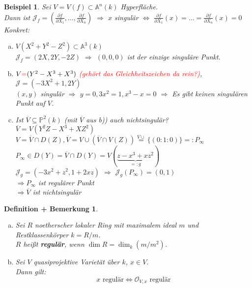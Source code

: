\documentclass[a4paper,12pt]{report}
\theoremstyle{break}
\newtheorem{DefBem}[Def]{Definition + Bemerkung}
\theoremstyle{nonumberbreak}
\newtheorem{nnBsp}{Beispiel}
\theoremstyle{nonumberplain}
\newcommand{\emp}[1]{\textbf{\emph{#1}}}
\newcommand{\begriff}[1]{{\index{#1}}\emp{#1}}
\newcommand{\A}{\mathbb{A}}
\newcommand{\IP}{\mathbb{P}}%
\newcommand{\calO}{\mathcal{O}}
\newcommand{\calJ}{\mathcal{J}}
\begin{document}
\begin{nnBsp}
Sei $V=V(f)\subset\A^n(k)$ Hyperfl\"ache.\\
Dann ist $\calJ_f=\left( \frac{\partial f}{\partial X_1},\ldots ,\frac{\partial f}{\partial X_n} \right)$ $\Longrightarrow$ $x$ singul\"ar $\Leftrightarrow$ $\frac{\partial f}{\partial X_1}(x)=\ldots =\frac{\partial f}{\partial X_n}(x)=0$\\
\emph{Konkret:}\begin{enumerate}[a)]
\item
	$V(X^2+Y^2-Z^2)\subset\A^3(k)$\\
	$\calJ_f=(2X,2Y,-2Z)$ $\Rightarrow $ $(0,0,0)$ ist der einzige singul\"are Punkt.
\item
	$V\textcolor{red}{=}(Y^2-X^3+X^3)$ \textcolor{red}{(geh\"ort das Gleichheitszeichen da rein?)}, $\calJ=(-3X^2+1,2Y)$\\
	$(x,y)$ singul\"ar $\Rightarrow$ $y=0, 3x^2=1, x^3-x=0$ $\Rightarrow $ Es gibt keinen singul\"aren Punkt auf $V$.
\item
	Ist $\overline V\subseteq\IP^2(k)$ (mit $\overline V$ aus b)) auch nichtsingul\"ar?\\
	$\overline V=V(Y^2Z-X^3+XZ^2)$\\
	$V=\overline V\cap D(Z), \overline V=V\cup(\overline V\cap V(Z)) \overset{V\cup}{=}\{(0:1:0)\}=:P_\infty$\\
	$P_\infty\in D(Y)=\overline V\cap D(Y)=V(\underbrace{z-x^3+xz^2}_{=:g})$\\
	$\calJ_g=(-3x^2+z^2,1+2xz)$ $\Rightarrow $ $\calJ_g(P_\infty)=(0,1)$\\
	$\Rightarrow P_\infty$ ist regul\"arer Punkt\\
	$\Rightarrow \overline V$ ist nichtsingul\"ar
\end{enumerate}\end{nnBsp}

\begin{DefBem}\label{19.3}\begin{enumerate}[a)]
\item
	Sei $R$ noetherscher lokaler Ring mit maximalem ideal $m$ und Restklassenk\"orper $k=R/m$.\\
	$R$ hei\ss t \begriff{regul\"ar}, wenn $\dim R=\dim_k(m/m^2)$.
\item\label{19.3b}
	Sei $V$ quasiprojektive Variet\"at \"uber $k$, $x\in V$.\\
	Dann gilt:
		\[x \text{ regul\"ar} \Leftrightarrow \calO_{V,x} \text{ regul\"ar}\]
\end{enumerate}\end{DefBem}
\end{document}
